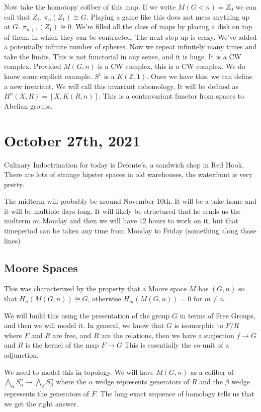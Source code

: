 \documentclass[10pt]{article}
\theoremstyle{definition}
\begin{document}
Now take the homotopy cofiber of this map. If we write $M(G<n)=Z_0$ we can call that $Z_1$. $\pi_n(Z_1)\cong G$. Playing a game like this does not mess anything up at $G$. $\pi_{n+1}(Z_1)\cong 0$. We're filled all the class of maps by placing a disk on top of them, in which they can be contracted. The next step up is crazy. We've added a potentially infinite number of spheres. Now we repeat infinitely many times and take the limits. This is not functorial in any sense, and it is huge. It is a CW complex. Provided $M(G,n)$ is a CW complex, this is a CW complex. We do know some explicit example. $S^1$ is a $K(\mathbb{Z},1)$. Once we have this, we can define a new invariant. We will call this invariant cohomology. It will be defined as $H^n(X,R)=[X,K(R,n)]$. This is a contravariant functor from spaces to Abelian groups. 
\section{October 27th, 2021}
	Culinary Indoctrination for today is Defonte's, a sandwich shop in Red Hook. There are lots of strange hipster spaces in old warehouses, the waterfront is very pretty. 
	
	The midterm will probably be around November 10th. It will be a take-home and it will be multiple days long. It will likely be structured that he sends us the midterm on Monday and then we will have 12 hours to work on it, but that timeperiod can be taken any time from Monday to Friday (something along those lines) 
	\subsection{Moore Spaces}
	This was characterized by the property that  a Moore space $M$ has $(G,n)$ so that $H_n(M(G,n))\cong G$, otherwise $H_m(M(G,n))=0$ for $m\neq n$.
	
	We will build this using the presentation of the group $G$ in terms of Free Groups, and then we will model it. 
	In general, we know that $G$ is isomorphic to $F/R$ where $F$ and $R$ are free, and $R$ are the relations, then we have a surjection $f\to G$ and $R$ is the kernel of the map $F\to G$ This is essentially the co-unit of a adjunction. 
	
	We need to model this in topology. We will have $M(G,n)$ as a cofiber of $\bigwedge_\alpha S_\alpha^n\to \bigwedge_\beta S_\beta^n$ where the $\alpha$ wedge represents generators of $R$ and the $\beta$ wedge represents the generators of $F$. The long exact sequence of homology tells us that we get the right answer. 
	
\end{document}
